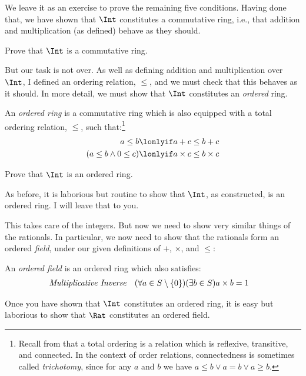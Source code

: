 \documentclass[../../../include/open-logic-section]{subfiles}
\begin{document}
We leave it as an exercise to prove the remaining five conditions.
Having done that, we have shown that $\Int$ constitutes a commutative
ring, i.e., that addition and multiplication (as defined) behave as
they should.

\begin{prob}
Prove that $\Int$ is a commutative ring.
\end{prob}

But our task is not over. As well as defining addition and
multiplication over $\Int$, I defined an ordering relation, $\leq$,
and we must check that this behaves as it should. In more detail, we
must show that $\Int$ constitutes an \emph{ordered} ring.

\begin{defn}
An \emph{ordered ring} is a commutative ring which is also equipped
with a total ordering relation, $\leq$, such that:\footnote{Recall
from  that a total ordering
is a relation which is reflexive, transitive, and connected. In the
context of order relations, connectedness is sometimes called
\emph{trichotomy}, since for any $a$ and $b$ we have $a \leq b \lor a
= b \lor a \geq b$.} 
\begin{align*}
	a \leq b &\lonlyif a + c \leq b + c\\
	(a \leq b \land 0 \leq c) &\lonlyif a \times c \leq b \times c
\end{align*}
\end{defn}

\begin{prob}
Prove that $\Int$ is an ordered ring. 
\end{prob}

As before, it is laborious but routine to show that $\Int$, as
constructed, is an ordered ring. I will leave that  to you.

This takes care of the integers. But now we need to show very similar
things of the rationals. In particular, we now need to show that the
rationals form an ordered \emph{field}, under our given definitions of
$+$, $\times$, and $\leq$:
\begin{defn}
An \emph{ordered field} is an ordered ring which also satisfies:
\begin{align*}
	\emph{Multiplicative Inverse}& & (\forall a \in S \setminus \{0\})(\exists b \in S) a\times b& = 1
\end{align*}
\end{defn}

Once you have shown that $\Int$ constitutes an ordered ring, it is
easy but laborious to show that $\Rat$ constitutes an ordered field.
\end{document}
